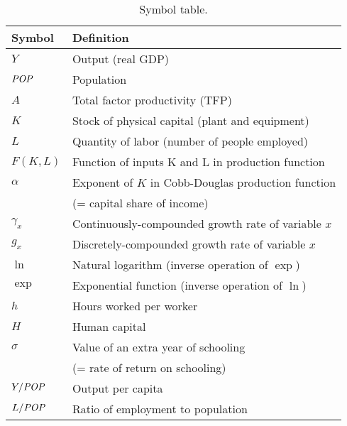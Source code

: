 \begin{table}[H]
\centering
\caption{Symbol table.}
\begin{tabular*}{0.9\textwidth}{l@{\extracolsep{\fill}}l}
\toprule
Symbol & Definition\\
\midrule
$Y$                            &Output (real GDP)\\
$\mbox{\em POP\/}$                      &Population\\
$A$                            &Total factor productivity (TFP)\\
$K$                            &Stock of physical capital (plant and equipment)\\
$L$                            &Quantity of labor (number of people employed)\\
$F(K,L)$                    &Function of inputs K and L in production function\\
$\alpha$                     &Exponent of $K$ in Cobb-Douglas production function \\
                            &(= capital share of income)\\
$\gamma_x$                  &Continuously-compounded growth rate of variable $x$\\
$g_x$                       &Discretely-compounded growth rate of variable $x$\\
$\ln$                        &Natural logarithm (inverse operation of $\exp$)\\
$\exp$                      &Exponential function (inverse operation of $\ln$)\\
$h$                         &Hours worked per worker\\
$H$                         &Human capital\\
$\sigma$                     &Value of an extra year of schooling \\
                            &(= rate of return on schooling)\\
$Y/\mbox{\em POP\/}$                        &Output per capita\\
$L/\mbox{\em POP\/}$                        &Ratio of employment to population\\
\bottomrule
\end{tabular*}
\end{table}


